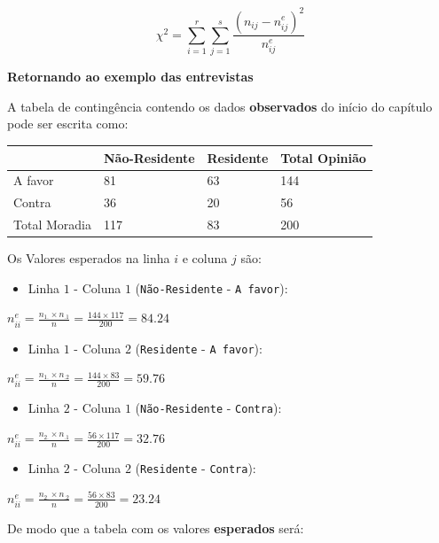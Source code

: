 \documentclass[
]{book}
\providecommand{\tightlist}{%
  \setlength{\itemsep}{0pt}\setlength{\parskip}{0pt}}
\begin{document}
\[\chi^2 = \sum_{i=1}^{r}\sum_{j=1}^{s}\frac{(n_{ij} - n_{ij}^{e})^2}{n_{ij}^{e}}\]

\textbf{Retornando ao exemplo das entrevistas}

A tabela de contingência contendo os dados \textbf{observados} do início do capítulo pode ser escrita como:

\begin{longtable}[]{@{}llll@{}}
\toprule
& Não-Residente & Residente & Total Opinião \\
\midrule
\endhead
A favor & 81 & 63 & 144 \\
Contra & 36 & 20 & 56 \\
Total Moradia & 117 & 83 & 200 \\
\bottomrule
\end{longtable}

Os Valores esperados na linha \(i\) e coluna \(j\) são:

\begin{itemize}
\tightlist
\item
  Linha \(1\) - Coluna \(1\) (\texttt{Não-Residente} - \texttt{A\ favor}):
\end{itemize}

\(n_{ii}^{e} = \frac{n_{1.} \times n_{.1}}{n} = \frac{144 \times 117}{200} = 84.24\)

\begin{itemize}
\tightlist
\item
  Linha \(1\) - Coluna \(2\) (\texttt{Residente} - \texttt{A\ favor}):
\end{itemize}

\(n_{ii}^{e} = \frac{n_{1.} \times n_{.2}}{n} = \frac{144 \times 83}{200} = 59.76\)

\begin{itemize}
\tightlist
\item
  Linha \(2\) - Coluna \(1\) (\texttt{Não-Residente} - \texttt{Contra}):
\end{itemize}

\(n_{ii}^{e} = \frac{n_{2.} \times n_{.1}}{n} = \frac{56 \times 117}{200} = 32.76\)

\begin{itemize}
\tightlist
\item
  Linha \(2\) - Coluna \(2\) (\texttt{Residente} - \texttt{Contra}):
\end{itemize}

\(n_{ii}^{e} = \frac{n_{2.} \times n_{.2}}{n} = \frac{56 \times 83}{200} = 23.24\)

De modo que a tabela com os valores \textbf{esperados} será:
\end{document}
